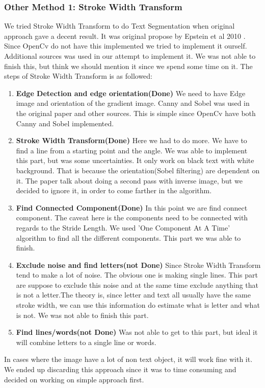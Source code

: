 \documentclass[Report.tex]{subfiles}
\begin{document}
\begin{flushleft}
  \subsubsection{Other Method 1: Stroke Width Transform}
  We tried Stroke Width Transform to do Text Segmentation when original approach gave a decent result. It was original propose by Epstein et al 2010 \cite{epshtein_stroke_2010}. Since OpenCv do not have this implemented we tried to implement it ourself. Additional sources was used in our attempt to implement it\cite{werner_text_????, _c++_????, bunn_strokewidthtransform:_2018}. We was not able to finish this, but think we should mention it since we spend some time on it. The steps of Stroke Width Transform is as followed:
  \begin{enumerate}
    \item \textbf{Edge Detection and edge orientation(Done)}
    We need to have Edge image and orientation of the gradient image.
    Canny and Sobel was used in the original paper and other sources. This is simple since OpenCv have both Canny and Sobel implemented.
    \item \textbf{Stroke Width Transform(Done)}
    Here we had to do more. We have to find a line from a starting point and the angle. We was able to implement this part, but was some uncertainties. It only work on black text with white background. That is because the orientation(Sobel filtering) are dependent on it. The paper talk about doing a second pass with inverse image, but we decided to ignore it, in order to come farther in the algorithm.
    \item \textbf{Find Connected Component(Done)}
    In this point we are find connect component. The caveat here is the components need to be connected with regards to the Stride Length. We used 'One Component At A Time' algorithm to find all the different components. This part we was able to finish.
    \item \textbf{Exclude noise and find letters(not Done)}
    Since Stroke Width Transform tend to make a lot of noise. The obvious one is making single lines. This part are suppose to exclude this noise and at the same time exclude anything that is not a letter.The theory is, since letter and text all usually have the same stroke width, we can use this information do estimate what is letter and what is not. We was not able to finish this part.
    \item \textbf{Find lines/words(not Done)}
    Was not able to get to this part, but ideal it will combine letters to a single line or words.
  \end{enumerate}
  In cases where the image have a lot of non text object, it will work fine with it. We ended up discarding this approach since it was to time consuming and decided on working on simple approach first.
\end{flushleft}
\end{document}
